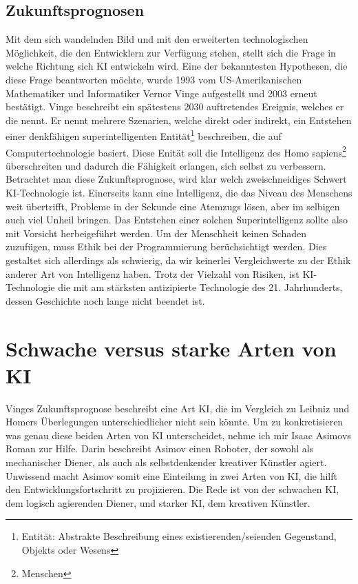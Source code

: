 \documentclass[12pt,german,ngerman]{report}
\begin{document}
    \section{Zukunftsprognosen}
        Mit dem sich wandelnden Bild und mit den erweiterten technologischen Möglichkeit, die den Entwicklern zur Verfügung stehen,
        stellt sich die Frage in welche Richtung sich KI entwickeln wird.
        Eine der bekanntesten Hypothesen, die diese Frage beantworten möchte, wurde 1993 vom US-Amerikanischen Mathematiker und 
        Informatiker Vernor Vinge aufgestellt und 2003
        erneut bestätigt. Vinge beschreibt ein spätestens 2030 auftretendes Ereignis, 
        welches er die \cite[1]{vinge1993technological} nennt. 
        Er nennt mehrere Szenarien, welche direkt oder indirekt, 
        ein Entstehen einer denkfähigen superintelligenten Entität\footnote{Entität: Abstrakte Beschreibung eines existierenden/seienden Gegenstand, Objekts oder Wesens}
        beschreiben, die auf Computertechnologie basiert.
        Diese Enität soll die Intelligenz des Homo sapiens\footnote{Menschen} überschreiten
        und dadurch die Fähigkeit erlangen, sich selbst zu verbessern.\\

        Betrachtet man diese Zukunftsprognose, wird klar welch zweischneidiges Schwert
        KI-Technologie ist.
        Einerseits kann eine Intelligenz, die das Niveau des Menschens weit übertrifft,
        Probleme in der Sekunde eine Atemzugs lösen, aber im selbigen auch viel Unheil bringen.
        Das Entstehen einer solchen Superintelligenz sollte also mit Vorsicht herbeigeführt werden.
        Um der Menschheit keinen Schaden zuzufügen, muss Ethik bei der Programmierung
        berüchsichtigt werden. Dies gestaltet sich allerdings als schwierig,
        da wir keinerlei Vergleichwerte zu der Ethik anderer Art von Intelligenz haben.
        Trotz der Vielzahl von Risiken, ist KI-Technologie die mit am stärksten antizipierte Technologie des 21. Jahrhunderts,
        dessen Geschichte noch lange nicht beendet ist.


\chapter{Schwache versus starke Arten von KI}
    Vinges Zukunftsprognose\cite[1]{vinge1993technological} beschreibt eine Art KI, die
    im Vergleich zu Leibniz und Homers Überlegungen unterschiedlicher nicht sein könnte.
    Um zu konkretisieren was genau diese beiden Arten von KI unterscheidet, nehme ich
    mir Isaac Asimovs Roman  zur Hilfe.
    Darin beschreibt Asimov einen Roboter, der sowohl als mechanischer Diener, als
    auch als selbstdenkender kreativer Künstler agiert.\cite{asimov2000der}
    Unwissend macht Asimov somit eine Einteilung in zwei Arten von KI,
    die hilft den Entwicklungsfortschritt zu projizieren.
    Die Rede ist von der schwachen KI, dem logisch agierenden Diener, und
    starker KI, dem kreativen Künstler.
\end{document}
